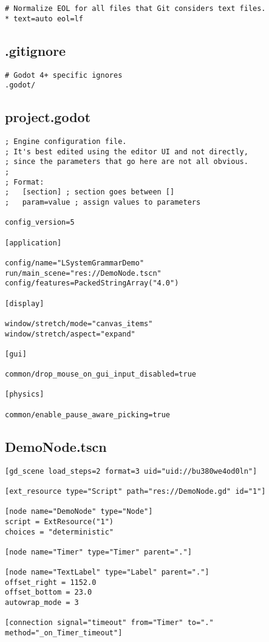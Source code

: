 \begin{lstlisting}
# Normalize EOL for all files that Git considers text files.
* text=auto eol=lf
\end{lstlisting}

\subsection{.gitignore}

\begin{lstlisting}
# Godot 4+ specific ignores
.godot/
\end{lstlisting}

\subsection{project.godot}

\begin{lstlisting}
; Engine configuration file.
; It's best edited using the editor UI and not directly,
; since the parameters that go here are not all obvious.
;
; Format:
;   [section] ; section goes between []
;   param=value ; assign values to parameters

config_version=5

[application]

config/name="LSystemGrammarDemo"
run/main_scene="res://DemoNode.tscn"
config/features=PackedStringArray("4.0")

[display]

window/stretch/mode="canvas_items"
window/stretch/aspect="expand"

[gui]

common/drop_mouse_on_gui_input_disabled=true

[physics]

common/enable_pause_aware_picking=true
\end{lstlisting}

\subsection{DemoNode.tscn}

\begin{lstlisting}
[gd_scene load_steps=2 format=3 uid="uid://bu380we4od0ln"]

[ext_resource type="Script" path="res://DemoNode.gd" id="1"]

[node name="DemoNode" type="Node"]
script = ExtResource("1")
choices = "deterministic"

[node name="Timer" type="Timer" parent="."]

[node name="TextLabel" type="Label" parent="."]
offset_right = 1152.0
offset_bottom = 23.0
autowrap_mode = 3

[connection signal="timeout" from="Timer" to="." method="_on_Timer_timeout"]
\end{lstlisting}

